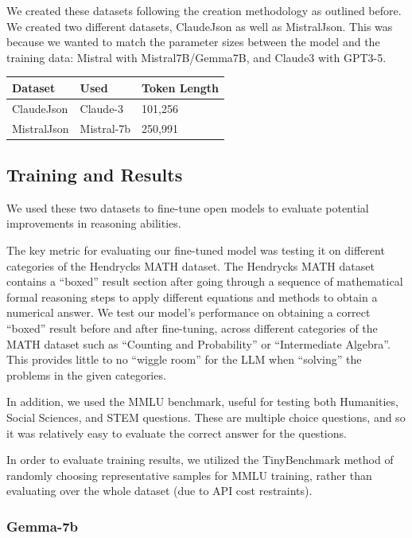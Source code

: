 We created these datasets following the creation methodology as outlined before. We created two different datasets, ClaudeJson as well as MistralJson. This was because we wanted to match the parameter sizes between the model and the training data: Mistral with Mistral7B/Gemma7B, and Claude3 with GPT3-5.

\begin{table}[h]
\centering
\begin{tabular}{lll}
\toprule
\textbf{Dataset} & \textbf{Used} & \textbf{Token Length} \\
\midrule
ClaudeJson & Claude-3 & 101,256 \\
MistralJson & Mistral-7b & 250,991 \\
\bottomrule
\end{tabular}
\end{table}

\subsection{Training and Results}

We used these two datasets to fine-tune open models to evaluate potential improvements in reasoning abilities.

The key metric for evaluating our fine-tuned model was testing it on different categories of the Hendrycks MATH dataset. The Hendrycks MATH dataset contains a ``boxed'' result section after going through a sequence of mathematical formal reasoning steps to apply different equations and methods to obtain a numerical answer. We test our model's performance on obtaining a correct ``boxed'' result before and after fine-tuning, across different categories of the MATH dataset such as ``Counting and Probability'' or ``Intermediate Algebra''. This provides little to no ``wiggle room'' for the LLM when ``solving'' the problems in the given categories.

In addition, we used the MMLU benchmark, useful for testing both Humanities, Social Sciences, and STEM questions. These are multiple choice questions, and so it was relatively easy to evaluate the correct answer for the questions.

In order to evaluate training results, we utilized the TinyBenchmark method \cite{polo2024tinybenchmarks} of randomly choosing representative samples for MMLU training, rather than evaluating over the whole dataset (due to API cost restraints).

\subsubsection{Gemma-7b}

